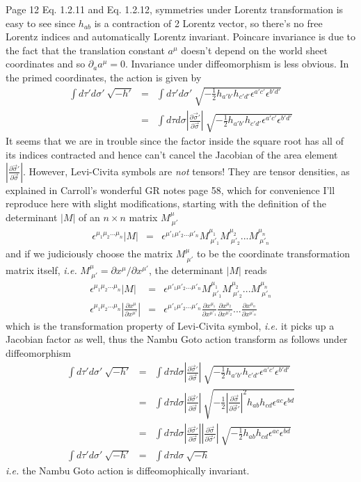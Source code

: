 \documentclass[aps,preprint,preprintnumbers,nofootinbib,showpacs,prd]{revtex4-1}
\newcommand{\ie}{{\it i.e.} }
\newcommand{\nbea}{\begin{eqnarray*}}
\newcommand{\neea}{\end{eqnarray*}}
\begin{document}
Page 12 Eq. 1.2.11 and Eq. 1.2.12, symmetries under Lorentz transformation is easy to see since $h_{ab}$  is a contraction of 2 Lorentz vector, so there's no free Lorentz indices and automatically Lorentz invariant. Poincare invariance is due to the fact that the translation constant $a^\mu$ doesn't depend on the world sheet coordinates and so $\partial_a a^\mu = 0$. Invariance under diffeomorphism is less obvious. In the primed coordinates, the action is given by
%
\nbea
\int d\tau' d\sigma'~\sqrt{-h'} & = & \int d\tau' d\sigma'~\sqrt{-\frac{1}{2} h_{a'b'}h_{c'd'} \epsilon^{a'c'}\epsilon^{b'd'}} \\
& = & \int d\tau d\sigma \left | \frac{\partial \vec \sigma'}{\partial \vec \sigma} \right | ~\sqrt{-\frac{1}{2} h_{a'b'}h_{c'd'} \epsilon^{a'c'}\epsilon^{b'd'}}
\neea
%
It seems that we are in trouble since the factor inside the square root has all of its indices contracted and hence can't cancel the Jacobian of the area element $\left | \frac{\partial \vec \sigma'}{\partial \vec \sigma} \right |$. However, Levi-Civita symbols are {\it not} tensors! They are tensor densities, as explained in Carroll's wonderful GR notes page 58, which for convenience I'll reproduce here with slight modifications, starting with the definition of the determinant $|M|$ of an $n \times n$ matrix $M^\mu_{~\mu'}$
%
\nbea
\epsilon^{\mu_1\mu_2 ... \mu_n} |M| & = & \epsilon^{\mu'_1\mu'_2 ... \mu'_n} M^{\mu_1}_{~\mu'_1}M^{\mu_2}_{~\mu'_2} ... M^{\mu_n}_{~\mu'_n}
\neea
%
and if we judiciously choose the matrix $M^{\mu}_{~\mu'}$ to be the coordinate transformation matrix itself, \ie $M^{\mu}_{~\mu'} = \partial x^\mu / \partial x^{\mu'}$, the determinant $|M|$ reads
%
\nbea
\epsilon^{\mu_1\mu_2 ... \mu_n} |M| & = & \epsilon^{\mu'_1\mu'_2 ... \mu'_n} M^{\mu_1}_{~\mu'_1}M^{\mu_2}_{~\mu'_2} ... M^{\mu_n}_{~\mu'_n} \\
\epsilon^{\mu_1\mu_2 ... \mu_n} \left | \frac{\partial x^{\mu}}{\partial x^{\mu'}} \right | & = & \epsilon^{\mu'_1\mu'_2 ... \mu'_n} \frac{\partial x^{\mu_1}}{\partial x^{\mu'_1}} \frac{\partial x^{\mu_2}}{\partial x^{\mu'_2}} ... \frac{\partial x^{\mu_n}}{\partial x^{\mu'_n}}
\neea
%
which is the transformation property of Levi-Civita symbol, \ie it picks up a Jacobian factor as well, thus the Nambu Goto action transform as follows under diffeomorphism
%
\nbea
\int d\tau' d\sigma'~\sqrt{-h'} & = & \int d\tau d\sigma \left | \frac{\partial \vec \sigma'}{\partial \vec \sigma} \right | ~\sqrt{-\frac{1}{2} h_{a'b'}h_{c'd'} \epsilon^{a'c'}\epsilon^{b'd'}} \\
& = & \int d\tau d\sigma \left | \frac{\partial \vec \sigma'}{\partial \vec \sigma} \right | ~\sqrt{-\frac{1}{2}  \left | \frac{\partial \vec \sigma}{\partial \vec \sigma'} \right |^2 h_{ab}h_{cd} \epsilon^{ac}\epsilon^{bd}} \\
& = & \int d\tau d\sigma \left | \frac{\partial \vec \sigma'}{\partial \vec \sigma} \right | \left | \frac{\partial \vec \sigma}{\partial \vec \sigma'} \right |~\sqrt{-\frac{1}{2}   h_{ab}h_{cd} \epsilon^{ac}\epsilon^{bd}} \\
\int d\tau' d\sigma'~\sqrt{-h'} & = & \int d\tau d\sigma ~\sqrt{-h}
\neea
%
\ie the Nambu Goto action is diffeomophically invariant.
\end{document}
